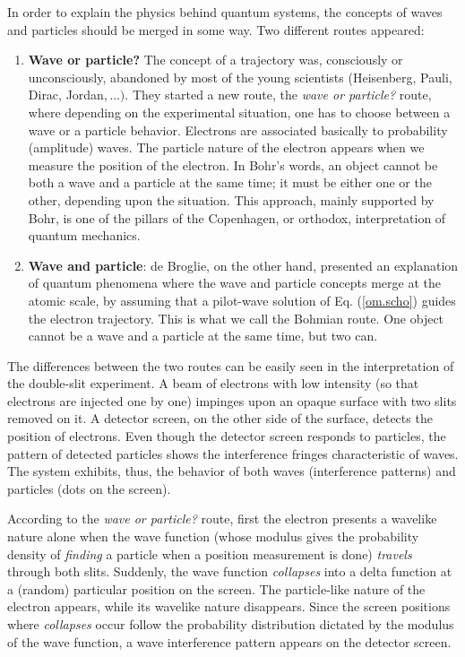 \documentclass[onecolumn,nofootinbib, secnumarabic, amsmath, nobibnotes,11pt,aps,pra]{revtex4-1}
\newcommand{\eref}[1]{Eq. (\ref{#1})}
\begin{document}
In order to  explain the
physics behind quantum systems, the concepts of waves and particles
should be merged in some way. Two different routes appeared:
\begin{enumerate}
\item \textbf{Wave or particle?} The concept of a trajectory was, consciously or unconsciously, abandoned by most of the young scientists (Heisenberg, Pauli, Dirac, Jordan$,\ldots).$ They started a new route, the \textit{wave or particle?} route, where depending on the experimental situation, one has to choose between a wave or a particle behavior. Electrons are associated basically to probability (amplitude) waves. The particle nature of the electron appears when we measure the position of the electron. In Bohr's words, an object cannot be both a wave and a particle at the same time; it must be either one or the other, depending upon the situation. This approach, mainly supported by Bohr, is one of the pillars of the Copenhagen, or orthodox, interpretation of quantum mechanics.

\item \textbf{Wave and particle}: de Broglie, on the other hand, presented an explanation of quantum phenomena where the wave and particle concepts merge at the atomic scale, by assuming that a pilot-wave solution of \eref{om.scho} guides the electron trajectory. This is what we call the Bohmian route. One object cannot be a wave and a particle at the same time, but two can.
\end{enumerate}

The differences between the two routes can be easily seen in the
interpretation of the double-slit experiment. A beam of electrons
with low intensity (so that electrons are injected one by one)
impinges upon an opaque surface with two slits removed on it. A
detector screen, on the other side of the surface, detects the
position of electrons. Even though the detector screen responds to
particles, the pattern of detected particles shows the interference
fringes characteristic of waves. The system exhibits, thus, the
behavior of both waves (interference patterns) and particles (dots
on the screen).

According to the \textit{wave or particle?} route, first the electron presents a wavelike nature alone when the wave function (whose modulus gives the probability density of \textit{finding} a particle when a position measurement is done) \textit{travels} through both slits. Suddenly, the wave function \textit{collapses} into a delta function at a (random) particular position on the screen. The particle-like nature of the electron appears, while its wavelike nature disappears. Since the screen positions where \textit{collapses} occur follow the probability distribution dictated by the modulus of the wave function, a wave interference pattern appears on the detector screen.
\end{document}
